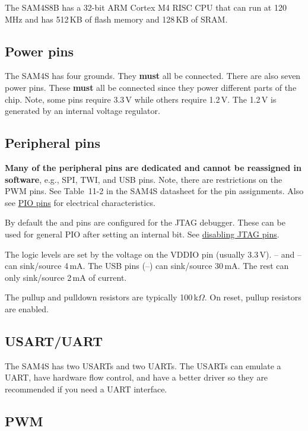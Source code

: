 The SAM4S8B has a 32-bit ARM Cortex M4 RISC CPU that can run at
120\,MHz and has 512\,KB of flash memory and 128\,KB of SRAM.


\subsection{Power pins}\label{power-pins}

The SAM4S has four grounds. They \textbf{must} all be connected. There
are also seven power pins. These \textbf{must} all be connected since
they power different parts of the chip. Note, some pins require 3.3\,V
while others require 1.2\,V. The 1.2\,V is generated by an internal
voltage regulator.


\subsection{Peripheral pins}\label{peripheral-pins}

\textbf{Many of the peripheral pins are dedicated and cannot be
  reassigned in software}, e.g., SPI, TWI, and USB pins. Note, there
are restrictions on the PWM pins.  See Table~11-2 in the SAM4S
datasheet for the pin assignments.  Also see \hyperref[PIO pins]{PIO
  pins} for electrical characteristics.

By default the  and  pins are configured for the
JTAG debugger.  These can be used for general PIO after setting an
internal bit.  See \protect\hyperref[disabling-jtag-pins]{disabling
JTAG pins}.

The logic levels are set by the voltage on the VDDIO pin (usually
3.3\,V).  -- and -- can
sink/source 4\,mA.  The USB pins (--) can
sink/source 30\,mA.  The rest can only sink/source 2\,mA of current.

The pullup and pulldown resistors are typically 100\,k$\Omega$.  On
reset, pullup resistors are enabled.


\subsection{USART/UART}\label{usartuart}

The SAM4S has two USARTs and two UARTs. The USARTs can emulate a
UART, have hardware flow control, and have a better driver so they are
recommended if you need a UART interface.


\subsection{PWM}\label{pwm}

